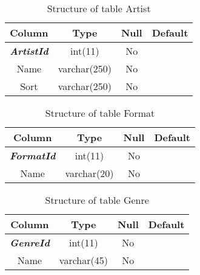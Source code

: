 %
%
\begin{longtable}{|c|c|c|c|} 
\caption{Structure of table Artist} 
\label{tab:Artist-structure} \\
\hline 
\multicolumn{1}{|c|}{\textbf{Column}} & \multicolumn{1}{|c|}{\textbf{Type}} & \multicolumn{1}{|c|}{\textbf{Null}} & \multicolumn{1}{|c|}{\textbf{Default}} \\ 
\hline
\textbf{\textit{ArtistId}} & int(11) & No &  \\ 
\hline 
Name & varchar(250) & No &  \\ 
\hline 
Sort & varchar(250) & No &  \\ 
\hline 
\end{longtable}

%
%
\begin{longtable}{|c|c|c|c|} 
\caption{Structure of table Format} 
\label{tab:Format-structure} \\
\hline 
\multicolumn{1}{|c|}{\textbf{Column}} & \multicolumn{1}{|c|}{\textbf{Type}} & \multicolumn{1}{|c|}{\textbf{Null}} & \multicolumn{1}{|c|}{\textbf{Default}} \\ 
\hline
\textbf{\textit{FormatId}} & int(11) & No &  \\ 
\hline 
Name & varchar(20) & No &  \\ 
\hline 
\end{longtable}

%
%
\begin{longtable}{|c|c|c|c|} 
\caption{Structure of table Genre} 
\label{tab:Genre-structure} \\
\hline 
\multicolumn{1}{|c|}{\textbf{Column}} & \multicolumn{1}{|c|}{\textbf{Type}} & \multicolumn{1}{|c|}{\textbf{Null}} & \multicolumn{1}{|c|}{\textbf{Default}} \\ 
\hline
\textbf{\textit{GenreId}} & int(11) & No &  \\ 
\hline 
Name & varchar(45) & No &  \\ 
\hline 
\end{longtable}

%
%

